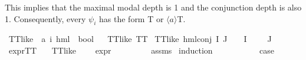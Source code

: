 \begin{isabellebody}
\begin{isamarkuptext}
   This implies that the maximal modal depth is 1 and the conjunction depth is also 1. Consequently, every $\psi_i$ has the form \textsf{T} or $\langle a \rangle$\textsf{T}.%
\end{isamarkuptext}\isamarkuptrue%
\isanewline
\isanewline
{}\isamarkupfalse%
\ TT{\isacharunderscore}{\kern0pt}like\ {\isacharcolon}{\kern0pt}{\isacharcolon}{\kern0pt}\ {\isachardoublequoteopen}{\isacharparenleft}{\kern0pt}{\isacharprime}{\kern0pt}a{\isacharcomma}{\kern0pt}\ {\isacharprime}{\kern0pt}i{\isacharparenright}{\kern0pt}\ hml\ {\isasymRightarrow}\ bool{\isachardoublequoteclose}\isanewline
\ \ \isanewline
{\isachardoublequoteopen}TT{\isacharunderscore}{\kern0pt}like\ TT{\isachardoublequoteclose}\ {\isacharbar}{\kern0pt}\isanewline
{\isachardoublequoteopen}TT{\isacharunderscore}{\kern0pt}like\ {\isacharparenleft}{\kern0pt}hml{\isacharunderscore}{\kern0pt}conj\ I\ J\ {\isasymPhi}{\isacharparenright}{\kern0pt}{\isachardoublequoteclose}\ \ {\isachardoublequoteopen}{\isacharparenleft}{\kern0pt}{\isasymPhi}\ {\isacharbackquote}{\kern0pt}I{\isacharparenright}{\kern0pt}\ {\isacharequal}{\kern0pt}\ {\isacharbraceleft}{\kern0pt}{\isacharbraceright}{\kern0pt}{\isachardoublequoteclose}\ {\isachardoublequoteopen}{\isacharparenleft}{\kern0pt}{\isasymPhi}\ {\isacharbackquote}{\kern0pt}\ J{\isacharparenright}{\kern0pt}\ {\isacharequal}{\kern0pt}\ {\isacharbraceleft}{\kern0pt}{\isacharbraceright}{\kern0pt}{\isachardoublequoteclose}\isanewline
\isanewline
{}\isamarkupfalse%
\ expr{\isacharunderscore}{\kern0pt}TT{\isacharcolon}{\kern0pt}\isanewline
\ \ \ {\isachardoublequoteopen}TT{\isacharunderscore}{\kern0pt}like\ {\isasymchi}{\isachardoublequoteclose}\isanewline
\ \ \ {\isachardoublequoteopen}expr\ {\isasymchi}\ {\isacharequal}{\kern0pt}\ {\isacharparenleft}{\kern0pt}{}{\isacharcomma}{\kern0pt}\ {}{\isacharcomma}{\kern0pt}\ {}{\isacharcomma}{\kern0pt}\ {}{\isacharcomma}{\kern0pt}\ {}{\isacharcomma}{\kern0pt}\ {}{\isacharparenright}{\kern0pt}{\isachardoublequoteclose}\isanewline
%
\isadelimproof
%
\endisadelimproof
%
\isatagproof
{}\isamarkupfalse%
\ assms\isanewline
{}\isamarkupfalse%
\ {\isacharparenleft}{\kern0pt}induction\ {\isasymchi}{\isacharparenright}{\kern0pt}\isanewline
\ \ \isamarkupfalse%
\ {}\isanewline
\ \ \isamarkupfalse%
\ \isamarkupfalse%
\ {\isacharquery}{\kern0pt}case\ \isamarkupfalse%

\end{isabellebody}
